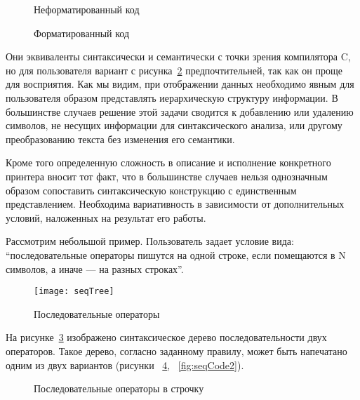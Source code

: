 \begin{figure}[h!]
	\centering
	
	\caption{Неформатированный код}
	\label{fig:wikiExUnfor}
\end{figure}

\begin{figure}[h!]
	\centering
	
	\caption{Форматированный код}
	\label{fig:wikiExBSD}
\end{figure}

Они эквиваленты синтаксически и семантически с точки зрения компилятора C, но для пользователя вариант с рисунка~\ref{fig:wikiExBSD} предпочтительней, так как он проще для восприятия. Как мы видим, при отображении данных необходимо явным для пользователя образом представлять иерархическую структуру информации. В большинстве случаев решение этой задачи сводится к добавлению или удалению символов, не несущих информации для синтаксического анализа, или другому преобразованию текста без изменения его семантики.

Кроме того определенную сложность в описание и исполнение конкретного принтера вносит тот факт, что в большинстве случаев нельзя однозначным образом сопоставить синтаксическую конструкцию с единственным представлением. Необходима вариативность в зависимости от дополнительных условий, наложенных на результат его работы.

Рассмотрим небольшой пример. Пользователь задает условие вида: “последовательные операторы пишутся на одной строке, если помещаются в N символов, а иначе --- на разных строках”.

\begin{figure}[h!]
	\centering
	\texttt{[image: seqTree]}
	\caption{Последовательные операторы}
	\label{fig:seqImage}
\end{figure}

На рисунке~\ref{fig:seqImage} изображено синтаксическое дерево последовательности двух операторов. Такое дерево, согласно заданному правилу, может быть напечатано одним из двух вариантов (рисунки ~\ref{fig:seqCode1}, ~\ref{fig:seqCode2}).

\begin{figure}[h!]
	\centering
	
	\caption{Последовательные операторы в строчку}
	\label{fig:seqCode1}
\end{figure}

